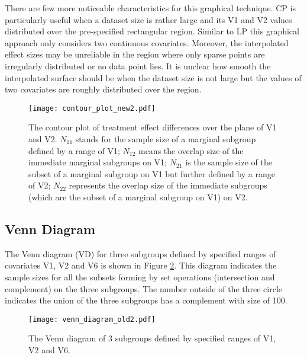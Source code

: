 \documentclass[Afour,sagev,times, doublespace]{sagej}
\begin{document}
{There are few more noticeable characteristics for this graphical technique. CP is particularly useful when a dataset size is rather large and its V1 and V2 values distributed over the pre-specified rectangular region. Similar to LP this graphical approach only considers two continuous covariates. Moreover, the interpolated effect sizes may be unreliable in the region where only sparse points are irregularly distributed or no data point lies. It is unclear how smooth the interpolated surface should be when the dataset size is not large but the values of two covariates are roughly distributed over the region.


\begin{figure}%
\begin{center}
				\texttt{[image: contour\_plot\_new2.pdf]} %
		\caption{The contour plot of treatment effect differences over the plane of V1 and V2. $N_{11}$ stands for the sample size of a marginal subgroup defined by a range of V1; $N_{12}$ means the overlap size of the immediate marginal subgroups on V1; $N_{21}$ is the sample size of the subset of a marginal subgroup on V1 but further defined by a range of V2; $N_{22}$ represents the overlap size of the immediate subgroups (which are the subset of a marginal subgroup on V1) on V2. }\label{fig:CP}
\end{center}
\end{figure}

\subsection{Venn Diagram}

The Venn diagram (VD) for three subgroups defined by specified ranges of covariates V1, V2 and V6 is shown in Figure \ref{fig:old_VD}. This diagram indicates the sample sizes for all the subsets forming by set operations (intersection and complement) on the three subgroups. The number outside of the three circle indicates the union of the three subgroups has a complement with size of 100.

\begin{figure}
\begin{center}
	\texttt{[image: venn\_diagram\_old2.pdf]}
		\caption{The Venn diagram of 3 subgroups defined by specified ranges of V1, V2 and V6.}\label{fig:old_VD}
\end{center}
\end{figure}

}
\end{document}
